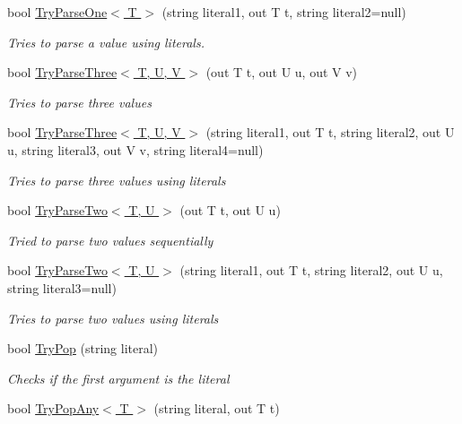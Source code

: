 \begin{DoxyCompactItemize}
bool \hyperlink{classOTA_1_1Command_1_1ArgumentList_add280e44f690058b1655e23b39d84822}{Try\+Parse\+One$<$ T $>$} (string literal1, out T t, string literal2=null)
\begin{DoxyCompactList}\small\item\em Tries to parse a value using literals. \end{DoxyCompactList}\item 
bool \hyperlink{classOTA_1_1Command_1_1ArgumentList_ac80a6731f8826ff819b74f923aca0bf2}{Try\+Parse\+Three$<$ T, U, V $>$} (out T t, out U u, out V v)
\begin{DoxyCompactList}\small\item\em Tries to parse three values \end{DoxyCompactList}\item 
bool \hyperlink{classOTA_1_1Command_1_1ArgumentList_acf474b50fa1cbaedb5e1736b1f295c20}{Try\+Parse\+Three$<$ T, U, V $>$} (string literal1, out T t, string literal2, out U u, string literal3, out V v, string literal4=null)
\begin{DoxyCompactList}\small\item\em Tries to parse three values using literals \end{DoxyCompactList}\item 
bool \hyperlink{classOTA_1_1Command_1_1ArgumentList_ac5c63b8f84751ef90a572ec2b7174d94}{Try\+Parse\+Two$<$ T, U $>$} (out T t, out U u)
\begin{DoxyCompactList}\small\item\em Tried to parse two values sequentially \end{DoxyCompactList}\item 
bool \hyperlink{classOTA_1_1Command_1_1ArgumentList_a6d98929ea7e2c44990a46c37c179a280}{Try\+Parse\+Two$<$ T, U $>$} (string literal1, out T t, string literal2, out U u, string literal3=null)
\begin{DoxyCompactList}\small\item\em Tries to parse two values using literals \end{DoxyCompactList}\item 
bool \hyperlink{classOTA_1_1Command_1_1ArgumentList_aa057f848fc9a002b8fc921cd33244948}{Try\+Pop} (string literal)
\begin{DoxyCompactList}\small\item\em Checks if the first argument is the literal \end{DoxyCompactList}\item 
bool \hyperlink{classOTA_1_1Command_1_1ArgumentList_ab2fed6dafbc4a252e949ca168a5c5195}{Try\+Pop\+Any$<$ T $>$} (string literal, out T t)

\end{DoxyCompactItemize}
